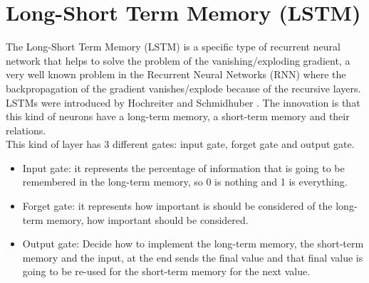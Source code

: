 \documentclass[12pt]{book}
\begin{document}
\section{Long-Short Term Memory (LSTM)}
The Long-Short Term Memory (LSTM) is a specific type of recurrent neural network that helps to solve the problem of the vanishing/exploding gradient, a very well known problem in the Recurrent Neural Networks (RNN) where the backpropagation of the gradient vanishes/explode because of the recursive layers. LSTMs were introduced by Hochreiter and Schmidhuber \cite{hochreiter1997lstm}. The innovation is that this kind of neurons have a long-term memory, a short-term memory and their relations.\\
This kind of layer has 3 different gates: input gate, forget gate and output gate.
\begin{itemize}
    \item Input gate: it represents the percentage of information that is going to be remembered in the long-term memory, so 0 is nothing and 1 is everything.
    \item Forget gate: it represents how important is should be considered of the long-term memory, how important should be considered.
    \item Output gate: Decide how to implement the long-term memory, the short-term memory and the input, at the end sends the final value and that final value is going to be re-used for the short-term memory for the next value.
\end{itemize}
\end{document}
